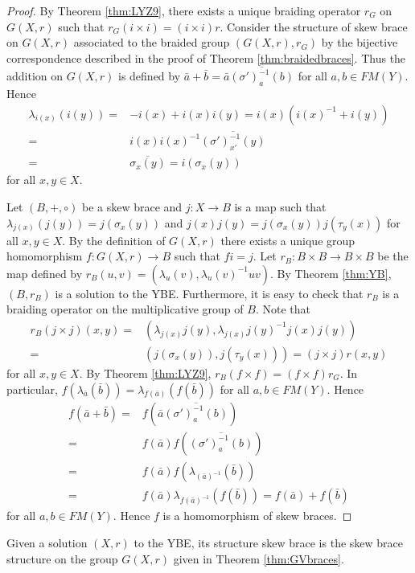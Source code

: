 \begin{proof}
By Theorem \ref{thm:LYZ9}, there exists a unique braiding operator $r_G$ on $G(X,r)$ such that $r_G(i\times i)=(i\times i)r$. Consider the structure of skew brace on $G(X,r)$ associated to the braided group $(G(X,r),r_G)$ by the bijective correspondence described in the proof of Theorem \ref{thm:braidedbraces}. Thus the addition on $G(X,r)$ is defined by $\bar a+\bar b=\bar a\overline{(\sigma')^{-1}_a(b)}$ for all $a,b\in FM(Y)$. Hence
\begin{align*}\lambda_{i(x)}(i(y))=&-i(x)+i(x)i(y)=i(x)(i(x)^{-1}+i(y))\\
=&i(x)i(x)^{-1}\overline{(\sigma')^{-1}_{x'}(y)}\\
=&\overline{\sigma_x(y)}=i(\sigma_x(y))
\end{align*}
for all $x,y\in X$.

Let $(B,+,\circ)$ be a skew brace and $j\colon X\rightarrow B$ is a map such that $\lambda_{j(x)}(j(y))=j(\sigma_x(y))$ and $j(x)j(y)=j(\sigma_x(y))j(\tau_y(x))$ for all $x,y\in X$. By the definition of $G(X,r)$ there exists a unique group homomorphism $f\colon G(X,r)\rightarrow B$ such that $fi=j$. Let $r_B\colon B\times B\rightarrow B\times B$ be the map defined by $r_B(u,v)=(\lambda_u(v),\lambda_u(v)^{-1}uv)$. By Theorem \ref{thm:YB}, $(B,r_B)$ is a solution to the YBE. Furthermore, it is easy to check that $r_B$ is a braiding operator on the multiplicative group of $B$. Note that
\begin{align*} r_B(j\times j)(x,y)=&(\lambda_{j(x)}j(y),\lambda_{j(x)}j(y)^{-1}j(x)j(y))\\
=&(j(\sigma_x(y)),j(\tau_y(x)))=(j\times j)r(x,y)
\end{align*}
for all $x,y\in X$. By Theorem \ref{thm:LYZ9}, $r_B(f\times f)=(f\times f)r_G$. In particular, $f\left(\lambda_{\bar a}(\bar b)\right)=\lambda_{f(\bar a)}(f(\bar b))$ for all $a,b\in FM(Y)$. Hence
\begin{align*}f(\bar a+\bar b)=& f\left(\bar a\overline{(\sigma')^{-1}_a(b)}\right)\\
=&f(\bar a)f\left(\overline{(\sigma')^{-1}_a(b)}\right)\\
=&f(\bar a)f\left(\lambda_{(\bar a)^{-1}}(\bar b)\right)\\
=&f(\bar a)\lambda_{f(\bar a)^{-1}}(f(\bar b))=f(\bar a)+f(\bar b)
\end{align*}
for all $a,b\in FM(Y)$. Hence $f$ is a homomorphism of skew braces.
\end{proof}

\begin{definition}
Given a solution $(X,r)$ to the YBE, its structure skew brace is the skew brace structure on the group $G(X,r)$ given in Theorem \ref{thm:GVbraces}.
\end{definition}

